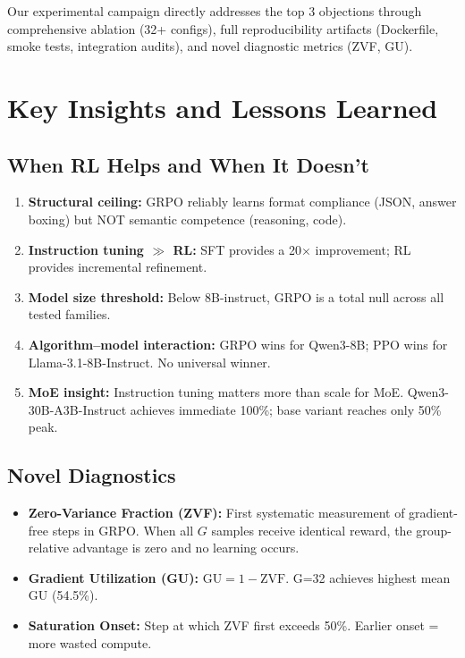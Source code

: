 \documentclass[12pt,a4paper]{report}
\theoremstyle{definition}
\begin{document}
Our experimental campaign directly addresses the top 3 objections through comprehensive ablation (32+ configs),
full reproducibility artifacts (Dockerfile, smoke tests, integration audits), and novel diagnostic metrics (ZVF, GU).




\chapter{Key Insights and Lessons Learned}
\label{ch:insights}

\section{When RL Helps and When It Doesn't}
\label{sec:when-rl}

\begin{enumerate}[nosep]
\item \textbf{Structural ceiling:} GRPO reliably learns format compliance (JSON, answer boxing) but NOT semantic competence (reasoning, code).
\item \textbf{Instruction tuning $\gg$ RL:} SFT provides a 20$\times$ improvement; RL provides incremental refinement.
\item \textbf{Model size threshold:} Below 8B-instruct, GRPO is a total null across all tested families.
\item \textbf{Algorithm--model interaction:} GRPO wins for Qwen3-8B; PPO wins for Llama-3.1-8B-Instruct. No universal winner.
\item \textbf{MoE insight:} Instruction tuning matters more than scale for MoE. Qwen3-30B-A3B-Instruct achieves immediate 100\%; base variant reaches only 50\% peak.
\end{enumerate}

\section{Novel Diagnostics}
\label{sec:novel-diagnostics}

\begin{itemize}[nosep]
\item \textbf{Zero-Variance Fraction (ZVF):} First systematic measurement of gradient-free steps in GRPO. When all $G$ samples receive identical reward, the group-relative advantage is zero and no learning occurs.
\item \textbf{Gradient Utilization (GU):} $\text{GU} = 1 - \text{ZVF}$. G=32 achieves highest mean GU (54.5\%).
\item \textbf{Saturation Onset:} Step at which ZVF first exceeds 50\%. Earlier onset = more wasted compute.
\end{itemize}
\end{document}
